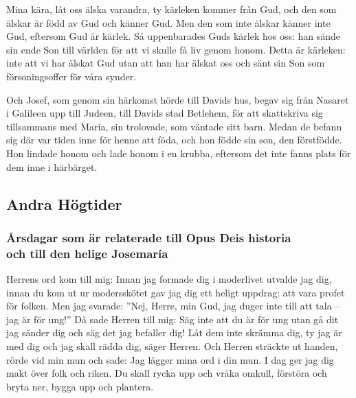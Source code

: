 {
Mina kära, låt oss älska varandra, ty kärleken kommer från Gud, och den som älskar är född av Gud och känner Gud.
Men den som inte älskar känner inte Gud, eftersom Gud är kärlek.
Så uppenbarades Guds kärlek hos oss: han sände sin ende Son till världen för att vi skulle få liv genom honom.
Detta är kärleken: inte att vi har älskat Gud utan att han har älskat oss och sänt sin Son som försoningsoffer för våra synder.}




{
Och Josef, som genom sin härkomst hörde till Davids hus, begav sig från Nasaret i Galileen upp till Judeen, till Davids stad Betlehem,
för att skattskriva sig tillsammans med Maria, sin trolovade, som väntade sitt barn.
Medan de befann sig där var tiden inne för henne att föda,
och hon födde sin son, den förstfödde. Hon lindade honom och lade honom i en krubba, eftersom det inte fanns plats för dem inne i härbärget.}

\newpage
\begin{samepage}
\subsection{Andra Högtider}

{\color{rubrica} \subsubsection{Årsdagar som är relaterade till Opus Deis historia \\och till den helige Josemaría}}

\end{samepage}
{Herrens ord kom till mig:
Innan jag formade dig i moderlivet
utvalde jag dig,
innan du kom ut ur modersskötet
gav jag dig ett heligt uppdrag:
att vara profet för folken.
Men jag svarade: ”Nej, Herre, min Gud, jag duger inte till att tala – jag är för ung!” Då sade Herren till mig:
Säg inte att du är för ung
utan gå dit jag sänder dig
och säg det jag befaller dig!
Låt dem inte skrämma dig,
ty jag är med dig
och jag skall rädda dig,
säger Herren.
Och Herren sträckte ut handen, rörde vid min mun och sade:
Jag lägger mina ord i din mun.
I dag ger jag dig makt
över folk och riken.
Du skall rycka upp och vräka omkull,
förstöra och bryta ner,
bygga upp och plantera.}


